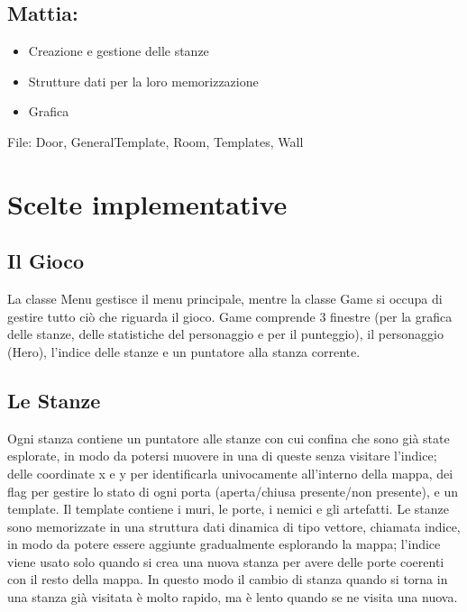 \documentclass[12pt]{article}
\begin{document}
\subsection*{Mattia:}
\begin{itemize}
    \item Creazione e gestione delle stanze 
    \item Strutture dati per la loro memorizzazione
    \item Grafica
\end{itemize}
File: Door, GeneralTemplate, Room, Templates, Wall

\newpage
\section{Scelte implementative}
\subsection{Il Gioco}
La classe Menu gestisce il menu principale, mentre la classe Game si occupa di gestire tutto ciò che riguarda il gioco.
Game comprende 3 finestre (per la grafica delle stanze, delle statistiche del personaggio e per il punteggio), 
il personaggio (Hero), l'indice delle stanze e un puntatore alla stanza corrente.

\subsection{Le Stanze}
Ogni stanza contiene un puntatore alle stanze con cui confina che sono già state esplorate, in modo da potersi muovere in una 
di queste senza visitare l'indice; delle coordinate x e y per identificarla univocamente all'interno della mappa, dei flag per
 gestire lo stato di ogni porta (aperta/chiusa presente/non presente), e un template. Il template contiene i muri, le porte, 
 i nemici e gli artefatti. \hfill\break
Le stanze sono memorizzate in una struttura dati dinamica di tipo vettore, chiamata indice, in modo da potere essere aggiunte gradualmente 
esplorando la mappa; l'indice viene usato solo quando si crea una nuova stanza per avere delle porte coerenti con il resto della mappa.
In questo modo il cambio di stanza quando si torna in una stanza già visitata è molto rapido, ma è lento quando se ne visita una nuova. 
\end{document}
